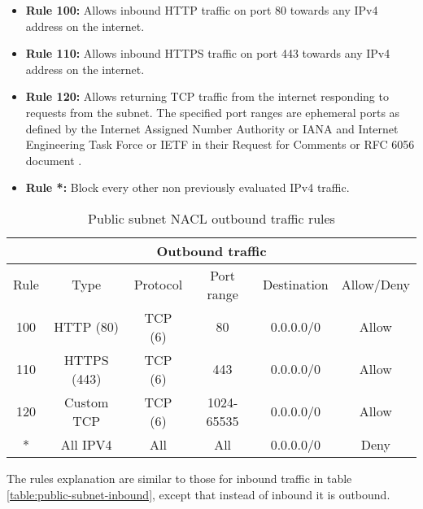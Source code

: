 \begin{itemize}
    \item \textbf{Rule 100:} Allows inbound HTTP traffic on port 80 towards any IPv4 address on the internet.
    \item \textbf{Rule 110:} Allows inbound HTTPS traffic on port 443 towards any IPv4 address on the internet.
    \item \textbf{Rule 120:} Allows returning TCP traffic from the internet responding to requests from the subnet. The specified port ranges are ephemeral ports as defined by the Internet Assigned Number Authority or IANA and Internet Engineering Task Force or IETF in their Request for Comments or RFC 6056 document \cite{rfc6056}.
    \item \textbf{Rule *:} Block every other non previously evaluated IPv4 traffic.
\end{itemize}

\begin{table}[H]
    \centering
    \begin{tabular}{|c|c|c|c|c|c|}
        \hline
        \multicolumn{6}{|c|}{Outbound traffic}                                \\
        \hline
        Rule & Type        & Protocol & Port range & Destination & Allow/Deny \\
        \hline
        100  & HTTP (80)   & TCP (6)  & 80         & 0.0.0.0/0   & Allow      \\
        \hline
        110  & HTTPS (443) & TCP (6)  & 443        & 0.0.0.0/0   & Allow      \\
        \hline
        120  & Custom TCP  & TCP (6)  & 1024-65535 & 0.0.0.0/0   & Allow      \\
        \hline
        *    & All IPV4    & All      & All        & 0.0.0.0/0   & Deny       \\
        \hline
    \end{tabular}
    \caption{Public subnet NACL outbound traffic rules}
    \label{table:public-subnet-outbound}
\end{table}

The rules explanation are similar to those for inbound traffic in table \ref{table:public-subnet-inbound}, except that instead of inbound it is outbound.




